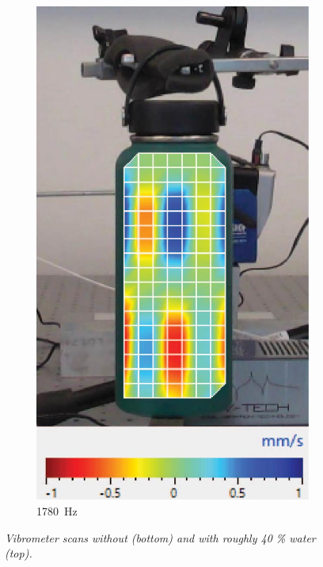 \documentclass[twoside,a4paper]{article}
\begin{document}
\begin{figure}[!t]
\begin{subfigure}[b]{.32\columnwidth}
         \includegraphics[width=\columnwidth]{Paper/Figures/NoWater_1780.jpg}
         \caption{1780\ Hz}
    \end{subfigure}
    
    \caption{\it{Vibrometer scans without (bottom) and with roughly 40 \% water (top).}}
        \label{fig:scans}
\end{figure}
\end{document}
